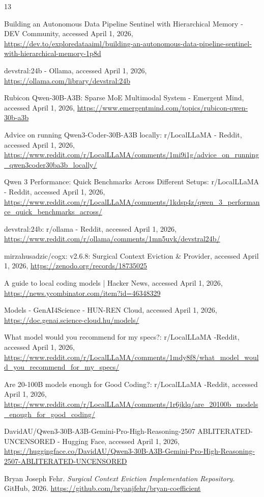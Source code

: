 \documentclass[11pt,a4paper]{article}
\begin{document}
\begin{thebibliography}{13}
\raggedright %

 Building an Autonomous Data Pipeline Sentinel with Hierarchical Memory - DEV Community, accessed April 1, 2026, \url{https://dev.to/exploredataaiml/building-an-autonomous-data-pipeline-sentinel-with-hierarchical-memory-1p8d}

 devstral:24b - Ollama, accessed April 1, 2026, \url{https://ollama.com/library/devstral:24b}

 Rubicon Qwen-30B-A3B: Sparse MoE Multimodal System - Emergent Mind, accessed April 1, 2026, \url{https://www.emergentmind.com/topics/rubicon-qwen-30b-a3b}

 Advice on running Qwen3-Coder-30B-A3B locally: r/LocalLLaMA - Reddit, accessed April 1, 2026, \url{https://www.reddit.com/r/LocalLLaMA/comments/1mi9i1g/advice_on_running_qwen3coder30ba3b_locally/}

 Qwen 3 Performance: Quick Benchmarks Across Different Setups: r/LocalLLaMA - Reddit, accessed April 1, 2026, \url{https://www.reddit.com/r/LocalLLaMA/comments/1kdsp4z/qwen_3_performance_quick_benchmarks_across/}

 devstral:24b: r/ollama - Reddit, accessed April 1, 2026, \url{https://www.reddit.com/r/ollama/comments/1mn5uvk/devstral24b/}

 mirzahusadzic/cogx: v2.6.8: Surgical Context Eviction \& Provider, accessed April 1, 2026, \url{https://zenodo.org/records/18735025}

 A guide to local coding models | Hacker News, accessed April 1, 2026, \url{https://news.ycombinator.com/item?id=46348329}

 Models - GenAI4Science - HUN-REN Cloud, accessed April 1, 2026, \url{https://doc.genai.science-cloud.hu/models/}

 What model would you recommend for my specs?: r/LocalLLaMA -Reddit, accessed April 1, 2026, \url{https://www.reddit.com/r/LocalLLaMA/comments/1mdy8f8/what_model_would_you_recommend_for_my_specs/}

 Are 20-100B models enough for Good Coding?: r/LocalLLaMA -Reddit, accessed April 1, 2026, \url{https://www.reddit.com/r/LocalLLaMA/comments/1r6jklq/are_20100b_models_enough_for_good_coding/}

 DavidAU/Qwen3-30B-A3B-Gemini-Pro-High-Reasoning-2507 ABLITERATED-UNCENSORED - Hugging Face, accessed April 1, 2026, \url{https://huggingface.co/DavidAU/Qwen3-30B-A3B-Gemini-Pro-High-Reasoning-2507-ABLITERATED-UNCENSORED}

 Bryan Joseph Fehr. \emph{Surgical Context Eviction Implementation Repository}. GitHub, 2026. \url{https://github.com/bryanjfehr/bryan-coefficient}

\end{thebibliography}
\end{document}
